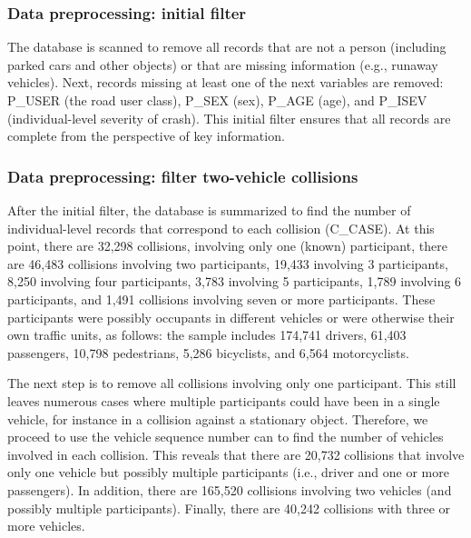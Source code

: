 \documentclass[]{elsarticle} %
\begin{document}
\endgroup{}

\hypertarget{data-preprocessing-initial-filter}{%
\subsubsection{Data preprocessing: initial
filter}\label{data-preprocessing-initial-filter}}

The database is scanned to remove all records that are not a person
(including parked cars and other objects) or that are missing
information (e.g., runaway vehicles). Next, records missing at least one
of the next variables are removed: P\_USER (the road user class), P\_SEX
(sex), P\_AGE (age), and P\_ISEV (individual-level severity of crash).
This initial filter ensures that all records are complete from the
perspective of key information.

\hypertarget{data-preprocessing-filter-two-vehicle-collisions}{%
\subsubsection{Data preprocessing: filter two-vehicle
collisions}\label{data-preprocessing-filter-two-vehicle-collisions}}

After the initial filter, the database is summarized to find the number
of individual-level records that correspond to each collision (C\_CASE).
At this point, there are 32,298 collisions, involving only one (known)
participant, there are 46,483 collisions involving two participants,
19,433 involving 3 participants, 8,250 involving four participants,
3,783 involving 5 participants, 1,789 involving 6 participants, and
1,491 collisions involving seven or more participants. These
participants were possibly occupants in different vehicles or were
otherwise their own traffic units, as follows: the sample includes
174,741 drivers, 61,403 passengers, 10,798 pedestrians, 5,286
bicyclists, and 6,564 motorcyclists.

The next step is to remove all collisions involving only one
participant. This still leaves numerous cases where multiple
participants could have been in a single vehicle, for instance in a
collision against a stationary object. Therefore, we proceed to use the
vehicle sequence number can to find the number of vehicles involved in
each collision. This reveals that there are 20,732 collisions that
involve only one vehicle but possibly multiple participants (i.e.,
driver and one or more passengers). In addition, there are 165,520
collisions involving two vehicles (and possibly multiple participants).
Finally, there are 40,242 collisions with three or more vehicles.
\end{document}
